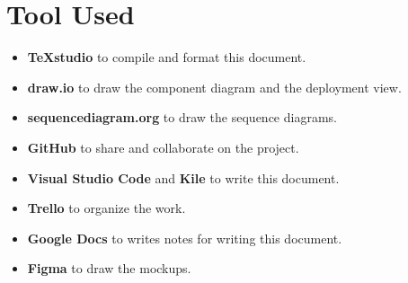 \section*{Tool Used}
\label{s:Tool_Used}%

\begin{itemize}
  \item \textbf{TeXstudio} to compile and format this document.
  \item \textbf{draw.io} to draw the component diagram and the deployment view.
  \item \textbf{sequencediagram.org} to draw the sequence diagrams.
  \item \textbf{GitHub} to share and collaborate on the project.
  \item \textbf{Visual Studio Code} and \textbf{Kile} to write this document.
  \item \textbf{Trello} to organize the work.
  \item \textbf{Google Docs} to writes notes for writing this document.
  \item \textbf{Figma} to draw the mockups.
\end{itemize}